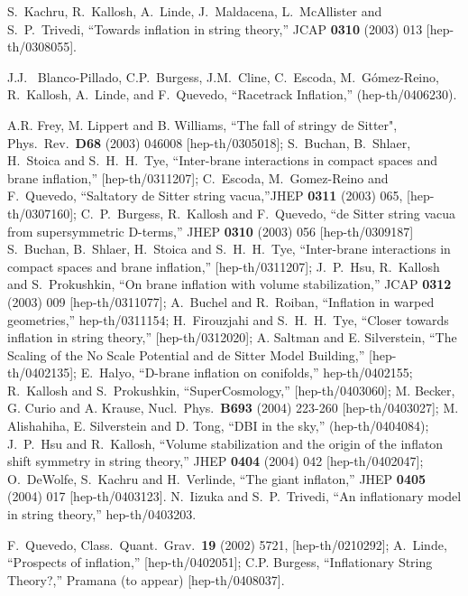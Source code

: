 \documentclass[12pt]{JHEP3}
\begin{document}
\begin{thebibliography}{4}
S.~Kachru, R.~Kallosh, A.~Linde, J.~Maldacena, L.~McAllister and
S.~P.~Trivedi, ``Towards inflation in string theory,'' JCAP {\bf
0310} (2003) 013 [hep-th/0308055].

J.J.~ Blanco-Pillado, C.P.~Burgess, J.M.~Cline, C.~Escoda,
M.~G\'omez-Reino, R.~Kallosh, A.~Linde, and F.~Quevedo,
``Racetrack Inflation,'' (hep-th/0406230).

A.R. Frey, M. Lippert and B. Williams, ``The fall of stringy de
Sitter", Phys.\ Rev.\ {\bf D68} (2003) 046008 [hep-th/0305018];
%
S.~Buchan, B.~Shlaer, H.~Stoica and S.~H.~H.~Tye, ``Inter-brane
interactions in compact spaces and brane inflation,''
[hep-th/0311207];
%
C.~Escoda, M.~Gomez-Reino and F.~Quevedo, ``Saltatory de Sitter
string vacua,''JHEP {\bf 0311} (2003) 065, [hep-th/0307160];
%
C.~P.~Burgess, R.~Kallosh and F.~Quevedo, ``de Sitter string vacua
from supersymmetric D-terms,'' JHEP {\bf 0310} (2003) 056
[hep-th/0309187]
%
%
S.~Buchan, B.~Shlaer, H.~Stoica and S.~H.~H.~Tye, ``Inter-brane
interactions in compact spaces and brane inflation,''
[hep-th/0311207];
%
J.~P.~Hsu, R.~Kallosh and S.~Prokushkin, ``On brane inflation with
volume stabilization,'' JCAP {\bf 0312} (2003) 009
[hep-th/0311077];
%
A.~Buchel and R.~Roiban, ``Inflation in warped geometries,''
hep-th/0311154;
%
H.~Firouzjahi and S.~H.~H.~Tye, ``Closer towards inflation in
string theory,'' [hep-th/0312020];
%
A. Saltman and E. Silverstein, ``The Scaling of the No Scale
Potential and de Sitter Model Building,'' [hep-th/0402135];
%
E.~Halyo, ``D-brane inflation on conifolds,'' hep-th/0402155;
%
R.~Kallosh and S.~Prokushkin, ``SuperCosmology,''
[hep-th/0403060];
%
M. Becker, G. Curio and A. Krause, Nucl.\ Phys.\ {\bf B693} (2004)
223-260 [hep-th/0403027];
%
M. Alishahiha, E. Silverstein and D. Tong, ``DBI in the sky,''
(hep-th/0404084);
%
J.~P.~Hsu and R.~Kallosh, ``Volume stabilization and the origin of
the inflaton shift symmetry in string theory,'' JHEP {\bf 0404}
(2004) 042 [hep-th/0402047];
%
 O.~DeWolfe, S.~Kachru and H.~Verlinde,
``The giant inflaton,'' JHEP {\bf 0405} (2004) 017
[hep-th/0403123].
%
N.~Iizuka and S.~P.~Trivedi, ``An inflationary model in string
theory,'' hep-th/0403203.

F.~Quevedo, Class.\ Quant.\ Grav.\  {\bf 19} (2002) 5721,
[hep-th/0210292];
%
A.~Linde, ``Prospects of inflation,'' [hep-th/0402051];
%
C.P. Burgess, ``Inflationary String Theory?,'' Pramana (to appear)
[hep-th/0408037].


\end{thebibliography}
\end{document}
